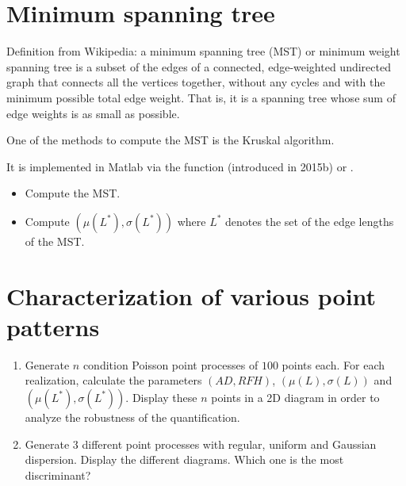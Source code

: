 \section{Minimum spanning tree}
Definition from Wikipedia: a minimum spanning tree (MST) or minimum weight spanning tree is a subset of the edges of a connected, edge-weighted undirected graph that connects all the vertices together, without any cycles and with the minimum possible total edge weight. 
That is, it is a spanning tree whose sum of edge weights is as small as possible.

One of the methods to compute the MST is the Kruskal algorithm. 

\begin{mcomment}
\begin{mremark}
It is implemented in Matlab via the function 
 (introduced in \matlabregistered{} 2015b) or .
\end{mremark}
\end{mcomment}

\begin{qbox}
 \begin{itemize}
 \item Compute the MST.
  \item  Compute $(\mu(L^*),\sigma(L^*))$ where $L^*$ denotes the set of the edge lengths of the 
MST.
 \end{itemize}
\end{qbox}


\section{Characterization of various point patterns}
\begin{qbox}
\begin{enumerate}
	\item Generate $n$ condition Poisson point processes of $100$ points each. For each realization, calculate the parameters $(AD,RFH)$, 
$(\mu(L),\sigma(L))$ and $(\mu(L^*),\sigma(L^*))$. Display these $n$ points in a 2D diagram in order to analyze the robustness of the 
quantification.
	\item Generate 3 different point processes with regular, uniform and Gaussian dispersion. Display the different diagrams. Which one 
is the most discriminant?
\end{enumerate}
\end{qbox}
